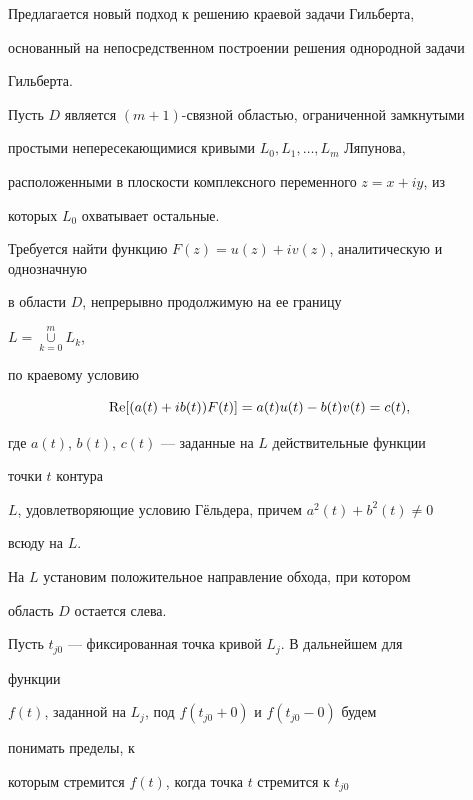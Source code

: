 \label{begin} 


 


Предлагается новый подход к решению краевой задачи Гильберта, 


основанный на непосредственном построении решения однородной задачи 


Гильберта. 


 


Пусть $D$ является $(m+1)$-связной областью, ограниченной замкнутыми 


простыми непересекающимися кривыми $L_0,L_1,\dotsc,L_m$ Ляпунова, 


расположенными в плоскости комплексного переменного $z=x+iy$, из 


которых $L_0$ охватывает остальные. 


Требуется найти функцию $F(z)=u(z)+iv(z)$, аналитическую и однозначную 


в области $D$, непрерывно продолжимую на ее границу 


$L=\mathop{\cup}\limits^m_{k=0}L_k$,


по краевому условию 


\begin{equation} 


\re[(a(t)+ib(t))F(t)]=a(t)u(t)-b(t)v(t)=c(t), 


\end{equation} 


где $a(t)$, $b(t)$, $c(t)$ --- заданные на $L$ действительные функции 


точки $t$ контура 


$L$, удовлетворяющие условию Г\"ельдера, причем $a^2(t)+b^2(t)\ne0$ 


всюду на $L$. 


 


На $L$ установим положительное направление обхода, при котором 


область $D$ остается слева. 


 


Пусть $t_{j0}$ --- фиксированная точка кривой $L_j$. В дальнейшем для 


функции 


$f(t)$, заданной на $L_j$, под $f(t_{j0}+0)$ и $f(t_{j0}-0)$ будем 


понимать пределы, к 


которым стремится $f(t)$, когда точка $t$ стремится к $t_{j0}$ 


